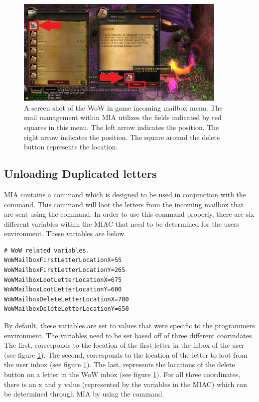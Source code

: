 \begin{figure}[h]
	\centering
	\includegraphics[width=0.9\textwidth]{images/WoWScrnShot_040518_115947b.jpg}
	\caption{A screen shot of the WoW in game incoming mailbox menu. The mail management within MIA utilizes the fields indicated by red squares in this menu. The left arrow indicates the  position. The right arrow indicates the  position. The square around the delete button represents the  location.} \label{wow mailbox receive}
\end{figure}

\subsection{Unloading Duplicated letters}

MIA contains a command  which is designed to be used in conjunction with the  command. This command will loot the letters from the incoming mailbox that are sent using the  command. In order to use this command properly, there are six different variables within the MIAC that need to be determined for the users environment. These variables are below.

\begin{lstlisting}
# WoW related variables.
WoWMailboxFirstLetterLocationX=55
WoWMailboxFirstLetterLocationY=265
WoWMailboxLootLetterLocationX=675
WoWMailboxLootLetterLocationY=600
WoWMailboxDeleteLetterLocationX=700
WoWMailboxDeleteLetterLocationY=650
\end{lstlisting}

By default, these variables are set to values that were specific to the programmers environment. The variables need to be set based off of three different coorindates. The first,  corresponds to the location of the first letter in the inbox of the user (see figure \ref{wow mailbox receive}). The second,  corresponds to the location of the letter to loot from the user inbox (see figure \ref{wow mailbox receive}). The last,  represents the locations of the delete button on a letter in the WoW inbox (see figure \ref{wow mailbox receive}).  For all three coordinates, there is an x and y value (represented by the variables in the MIAC) which can be determined through MIA by using the  command.